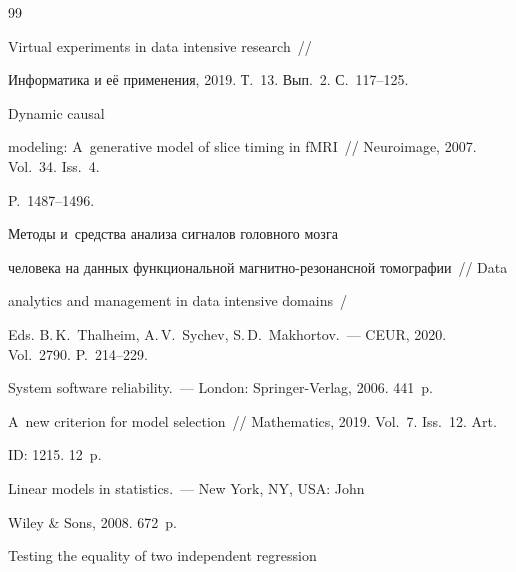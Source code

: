 {\small\frenchspacing

{%


\begin{thebibliography}{99}


 Virtual experiments in data intensive research~/\!\!/ 

Информатика и её применения, 2019. Т.~13. Вып.~2. С.~117--125.


 Dynamic causal 

modeling: A~generative model of slice timing in fMRI~/\!\!/ Neuroimage, 2007. Vol.~34. Iss.~4. 

P.~1487--1496.



Методы и~средства анализа сигналов головного мозга 

человека на данных функциональной маг\-нит\-но-ре\-зо\-нанс\-ной томографии~/\!\!/ Data 

analytics and management in data intensive domains~/

Eds. B.\,K.~Thalheim, A.\,V.~Sychev, S.\,D.~Makhortov.~--- CEUR, 2020. Vol.~2790. P.~214--229. 




 System software reliability.~--- London: Springer-Verlag, 2006. 441~p.




 A~new criterion for model selection~/\!\!/ Mathematics, 2019. Vol.~7. Iss.~12. Art. 

ID: 1215. 12~p.




 Linear models in statistics.~--- New York, NY, USA: John 

Wiley \& Sons, 2008. 672~p.


 Testing the equality of two independent regression 


\end{thebibliography}}}
